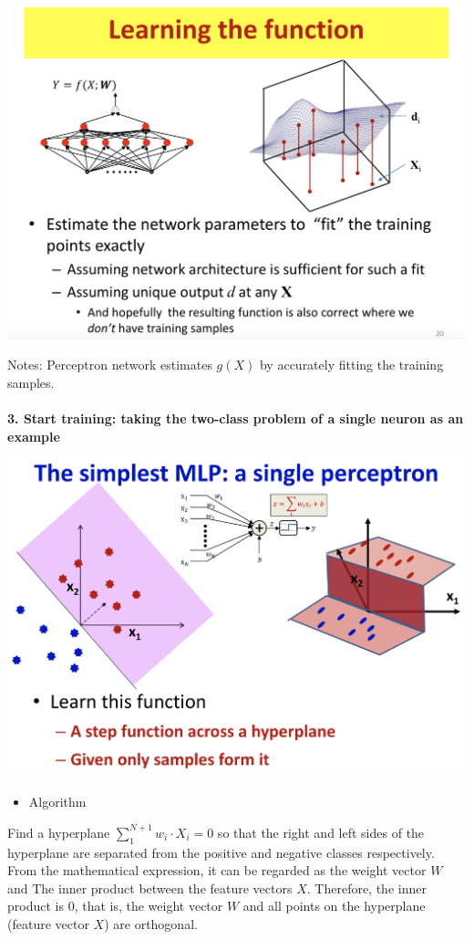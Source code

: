 \documentclass{article}
\begin{document}
	\includegraphics[scale=0.2]{44.png}
	
	Notes: Perceptron network estimates $g(X)$ by accurately fitting the training samples. \\ \\
	
	
	\textbf{3. Start training: taking the two-class problem of a single neuron as an example}
	
	\includegraphics[scale=0.2]{45.png}
	
	
	\begin{itemize}
		\item Algorithm
	\end{itemize}
	
	Find a hyperplane $\sum_{1}^{N+1}{w_i \cdot  X_i}=0$ so that the right and left sides of the hyperplane are separated from the positive and negative classes respectively. From the mathematical expression, it can be regarded as the weight vector $W$ and The inner product between the feature vectors $X$. Therefore, the inner product is 0, that is, the weight vector $W$ and all points on the hyperplane (feature vector $X$) are orthogonal.
	
\end{document}
